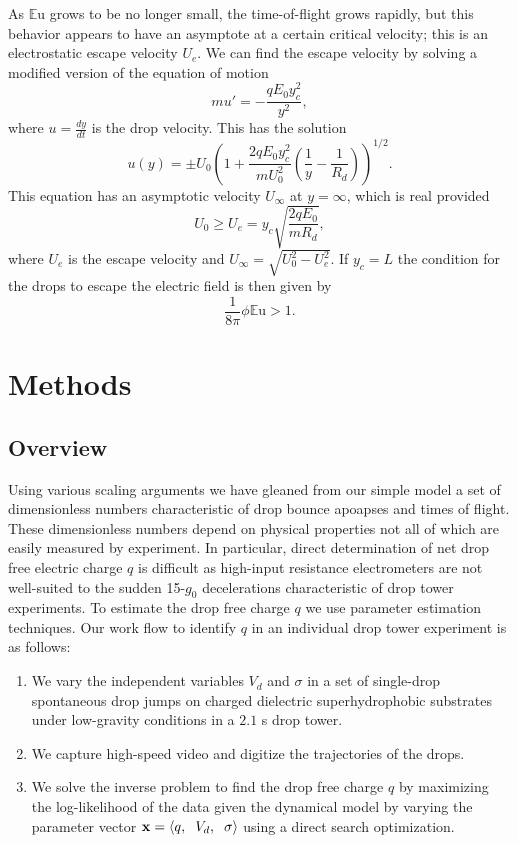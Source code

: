 \documentclass[aip,reprint, floatfix]{revtex4-1}
\begin{document}
As $\mathbb{E}\mbox{u}$ grows to be no longer small, the time-of-flight grows rapidly, but this behavior appears to have an asymptote at a certain critical velocity; this is an electrostatic escape velocity $U_e$. We can find the escape velocity by solving a modified version of the equation of motion
\[ m u' = - \frac{q E_0 y_c^2}{y^2}, \]
where $u = \frac{d y}{d t}$ is the drop velocity. This has the solution
\[ u(y) = \pm U_0 \left(1 + \frac{2q E_0 y_c^2}{m U_0^2} \left( \frac{1}{y} - \frac{1}{R_d} \right) \right)^{1/2}.
\]
This equation has an asymptotic velocity $U_{\infty}$ at $y = \infty$, which is real provided 
\[ U_0 \geq  U_e = y_c \sqrt{\frac{2 q E_0 }{m R_d}},
\]
where $U_e$ is the escape velocity and $U_{\infty} = \sqrt{U_0^2 - U_e^2}$. If $y_c=L$ the condition for the drops to escape the electric field is then given by
\begin{equation}\label{escape}
\frac{1}{8 \pi} \phi \mathbb{E}\mbox{u} > 1.
\end{equation}

\section{Methods}
\subsection{Overview}
Using various scaling arguments we have gleaned from our simple model a set of dimensionless numbers characteristic of drop bounce apoapses and times of flight. These dimensionless numbers depend on physical properties not all of which are easily measured by experiment. In particular, direct determination of net drop free electric charge $q$ is difficult as high-input resistance electrometers are not well-suited to the sudden 15-$g_0$ decelerations characteristic of drop tower experiments. To estimate the drop free charge $q$ we use parameter estimation techniques. Our work flow to identify $q$ in an individual drop tower experiment is as follows:
\begin{enumerate}
\item We vary the independent variables $V_d$ and $\sigma$ in a set of single-drop spontaneous drop jumps on charged dielectric superhydrophobic substrates under low-gravity conditions in a $2.1$ s drop tower. 
\item We capture high-speed video and digitize the trajectories of the drops. 
\item We solve the inverse problem to find the drop free charge $q$ by maximizing the log-likelihood of the data given the dynamical model by varying the parameter vector $\mathbf{x} = \left\langle q, \hspace{2 mm} V_d, \hspace{2 mm} \sigma \right\rangle$ using a direct search optimization.                     
\end{enumerate}
\end{document}
